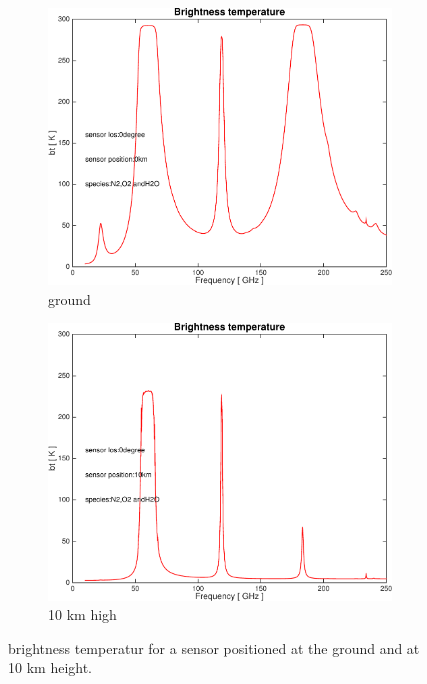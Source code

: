 \documentclass[paper=a4, fontsize=11pt]{scrartcl} %
\begin{document}
\begin{figure}[H]
 \centering
 \begin{subfigure}[h!]{0.46\textwidth}
 \includegraphics[width=\textwidth]{plots/bt_N2+O2+H2O_0km_0deg.pdf}
 \caption{ground}
 \end{subfigure}
 \begin{subfigure}[h!]{0.45\textwidth}
 \includegraphics[width=\textwidth]{plots/bt_N2+O2+H2O_10km_0deg.pdf}
 \caption{10 km high}
 \end{subfigure}
 \caption{brightness temperatur for a sensor positioned at the ground and at 10 km height. }
 \label{figure:abs_pressure}
\end{figure}
\end{document}
